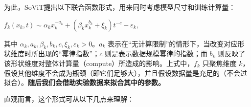 \documentclass[zihao=false,fontset=windows]{ctexart}
\newcommand{\bigmath}[1]{%
  \begin{center}\large$\displaystyle #1$\end{center}%
}
\begin{document}
为此，SoViT提出以下联合函数形式，用来同时考虑模型尺寸和训练计算量：\par

\bigmath{f_k(x_k,t)\sim\alpha_kx_k^{-a_k}+(\beta_kx_k^{b_k}+\xi_k)t^{-c}+\varepsilon_k,}

其中 $\alpha_k,a_k,\beta_k,b_k,c,\xi_k,\varepsilon_k>0$。$a_k$ 表示在“无计算限制”的情形下，当改变对应形状维度时所出现的“幂律指数”；$c$ 则是表示数据规模幂律的指数；而 $b_k$ 则反映了该形状维度对整体计算量（compute）所造成的影响。上式中，$f_k$ 只聚焦维度 $k$，假设其他维度不会成为瓶颈（即它们足够大），并且假设数据量是充足的（不会过拟合）。\textcolor{feishuRed}{\textbf{随后我们会借助实验数据来拟合其中的参数。}}\par

直观而言，这个形式可从以下几点来理解：\par
\end{document}
